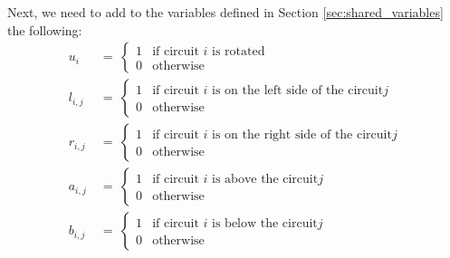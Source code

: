     Next, we need to add to the variables defined in Section \ref{sec:shared_variables} the following:
    \begin{align*}
        u_i\    &\ =\ \begin{cases}
                              1 & \text{if circuit } i \text{ is rotated}                           \\
                              0 & \text{otherwise}
                          \end{cases}                                                               \\
        l_{i,j} &\ =\ \begin{cases}
                              1 & \text{if circuit } i \text{ is on the left side of the circuit} j \\
                              0 & \text{otherwise}
                          \end{cases}                                                               \\
        r_{i,j} &\ =\ \begin{cases}
                            1 & \text{if circuit } i \text{ is on the right side of the circuit} j  \\
                            0 & \text{otherwise}
                        \end{cases}                                                                 \\
        a_{i,j} &\ =\ \begin{cases}
                            1 & \text{if circuit } i \text{ is above the circuit} j                 \\
                            0 & \text{otherwise}
                        \end{cases}                                                                 \\
        b_{i,j} &\ =\ \begin{cases}
                            1 & \text{if circuit } i \text{ is below the circuit} j                 \\
                            0 & \text{otherwise}
                        \end{cases}
    \end{align*}

